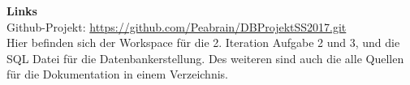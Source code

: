 \documentclass[a4paper ,8pt,x11names]{article}
\begin{document}
\begin{flushleft}
\textbf{Links}
\vspace{0.25cm}\\
Github-Projekt:
\url{https://github.com/Peabrain/DBProjektSS2017.git}
\vspace{0.25cm}\\
Hier befinden sich der Workspace für die 2. Iteration Aufgabe 2 und 3, und die SQL Datei für die Datenbankerstellung. Des weiteren sind auch die alle Quellen für die Dokumentation in einem Verzeichnis.
\end{flushleft}
\end{document}
